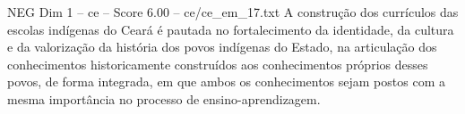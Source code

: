 \begin{textsample}{NEG Dim 1 – ce – Score 6.00 – ce/ce\_em\_17.txt}
A construção dos currículos das escolas indígenas do Ceará é pautada no fortalecimento da identidade, da cultura e da valorização da história dos povos indígenas do Estado, na articulação dos conhecimentos historicamente construídos aos conhecimentos próprios desses povos, de forma integrada, em que ambos os conhecimentos sejam postos com a mesma importância no processo de ensino-aprendizagem.

\end{textsample}
